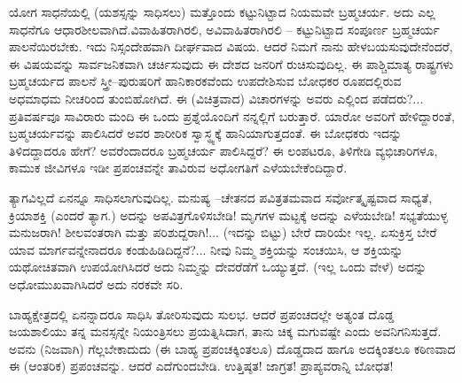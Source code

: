 \newpage

ಯೋಗ ಸಾಧನೆಯಲ್ಲಿ (ಯಶಸ್ಸನ್ನು ಸಾಧಿಸಲು) ಮತ್ತೊಂದು ಕಟ್ಟುನಿಟ್ಟಾದ ನಿಯಮವೇ ಬ್ರಹ್ಮಚರ್ಯ. ಅದು ಎಲ್ಲ ಸಾಧನೆಗೂ ಆಧಾರಶೀಲವಾಗಿದೆ.\break ವಿವಾಹಿತರಾಗಿರಲಿ, ಅವಿವಾಹಿತರಾಗಿರಲಿ – ಕಟ್ಟುನಿಟ್ಟಾದ ಸಂಪೂರ್ಣ ಬ್ರಹ್ಮಚರ್ಯ ಪಾಲನೆಯಿರಬೇಕು. ಇದು ನಿಸ್ಸಂದೇಹವಾಗಿ ದೀರ್ಘವಾದ ವಿಷಯ. ಆದರೆ ನಿಮಗೆ ನಾನು ಹೇಳಬಯಸುವುದೇನೆಂದರೆ, ಈ ವಿಷಯವನ್ನು ಸಾರ್ವಜನಿಕವಾಗಿ ಚರ್ಚಿಸುವುದು ಈ ದೇಶದ ಜನರಿಗೆ ರುಚಿಸುವುದಿಲ್ಲ. ಈ ಪಾಶ್ಚಿಮಾತ್ಯ ರಾಷ್ಟ್ರಗಳು ಬ್ರಹ್ಮಚರ್ಯದ ಪಾಲನೆ ಸ್ತ್ರೀ–ಪುರುಷರಿಗೆ ಹಾನಿಕಾರಕವೆಂದು ಉಪದೇಶಿಸುವ ಬೋಧಕರ ರೂಪದಲ್ಲಿರುವ ಅಧಮಾಧಮ ನೀಚರಿಂದ ತುಂಬಿಹೋಗಿದೆ. ಈ (ವಿಚಿತ್ರವಾದ) ವಿಚಾರಗಳನ್ನು ಅವರು ಎಲ್ಲಿಂದ ಪಡೆದರು?... ಪ್ರತಿವರ್ಷವೂ ಸಾವಿರಾರು ಮಂದಿ ಈ ಒಂದು ಪ್ರಶ್ನೆಯೊಂದಿಗೆ ನನ್ನಲ್ಲಿಗೆ ಬರುತ್ತಾರೆ. ಯಾರೋ ಅವರಿಗೆ ಹೇಳಿದ್ದಾರಂತೆ, ಬ್ರಹ್ಮಚರ್ಯವನ್ನು ಪಾಲಿಸಿದರೆ ಅವರ ಶಾರೀರಿಕ ಸ್ವಾಸ್ಥ್ಯಕ್ಕೆ ಹಾನಿಯಾಗುತ್ತದಂತೆ. ಈ ಬೋಧಕರು ಇದನ್ನು ತಿಳಿದದ್ದಾದರೂ ಹೇಗೆ? ಅವರೆಂದಾದರೂ ಬ್ರಹ್ಮಚರ್ಯ ಪಾಲಿಸಿದ್ದರೆ? ಈ ಲಂಪಟರೂ, ತಿಳಿಗೇಡಿ ವ್ಯಭಿಚಾರಿಗಳೂ, ಕಾಮುಕ ಜೀವಿಗಳೂ ಇಡೀ ಪ್ರಪಂಚವನ್ನೇ ತಾವಿರುವ ಅಧೋಗತಿಗೆ ಎಳೆಯಬೇಕೆಂದಿದ್ದಾರೆ.

ತ್ಯಾಗವಿಲ್ಲದೆ ಏನನ್ನೂ ಸಾಧಿಸಲಾಗುವುದಿಲ್ಲ. ಮನುಷ್ಯ –ಚೇತನದ ಪವಿತ್ರತಮವಾದ ಸರ್ವೋತ್ಕೃಷ್ಟವಾದ ಸಾಧ್ಯತೆ, ಕ್ರಿಯಾಶಕ್ತಿ (ಎಂದರೆ ತ್ಯಾಗ.) ಅದನ್ನು ಅಪವಿತ್ರಗೊಳಿಸಬೇಡಿ! ಮೃಗಗಳ ಮಟ್ಟಕ್ಕೆ ಅದನ್ನು ಎಳೆಯಬೇಡಿ! ಸಭ್ಯತೆಯುಳ್ಳ ಮನುಜರಾಗಿ! ಶೀಲವಂತರಾಗಿ ಮತ್ತು ಪರಿಶುದ್ದರಾಗಿ!... (ಇದನ್ನು ಬಿಟ್ಟು) ಬೇರೆ ದಾರಿಯೇ ಇಲ್ಲ. ಏಸುಕ್ರಿಸ್ತ ಬೇರೆ ಯಾವ ಮಾರ್ಗವನ್ನೇನಾದರೂ ಕಂಡುಹಿಡಿದಿದ್ದನೆ?... ನೀವು ನಿಮ್ಮ ಶಕ್ತಿಯನ್ನು ಸಂಚಯಿಸಿ, ಆ ಶಕ್ತಿಯನ್ನು ಯಥೋಚಿತವಾಗಿ ಉಪಯೋಗಿಸಿದರೆ ಅದು ನಿಮ್ಮನ್ನು ದೇವರೆಡೆಗೆ ಒಯ್ಯುತ್ತದೆ. (ಇಲ್ಲ ಒಂದು ವೇಳೆ) ಅದನ್ನು ಅಧೋಮುಖವಾಗಿಸಿದರೆ ಅದು ನರಕವೇ ಸರಿ.

ಬಾಹ್ಯಕ್ಷೇತ್ರದಲ್ಲಿ ಏನನ್ನಾದರೂ ಸಾಧಿಸಿ ತೋರಿಸುವುದು ಸುಲಭ. ಆದರೆ ಪ್ರಪಂಚದಲ್ಲೇ ಅತ್ಯಂತ ದೊಡ್ಡ ಜಯಶಾಲಿಯು ತನ್ನ ಮನಸ್ಸನ್ನೇ ನಿಯಂತ್ರಿಸಲು ಪ್ರಯತ್ನಿಸಿದಾಗ, ತಾನು ಚಿಕ್ಕ ಮಗುವಷ್ಟೇ ಎಂದು ಅವನಿಗನಿಸುತ್ತದೆ. ಅವನು (ನಿಜವಾಗಿ) ಗೆಲ್ಲಬೇಕಾದುದು (ಈ ಬಾಹ್ಯ ಪ್ರಪಂಚಕ್ಕಿಂತಲೂ) ದೊಡ್ಡದಾದ ಹಾಗೂ ಅದಕ್ಕಿಂತಲೂ ಕಠಿಣವಾದ ಈ (ಆಂತರಿಕ) ಪ್ರಪಂಚವನ್ನು. ಆದರೆ ಎದೆಗುಂದಬೇಡಿ. ಉತ್ತಿಷ್ಠತ! ಜಾಗ್ರತ! ಪ್ರಾಪ್ಯವರಾನ್ನಿ ಬೋಧತ!

